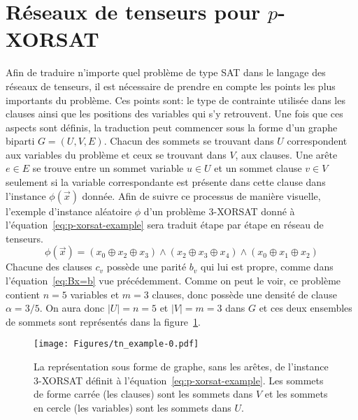 \section{Réseaux de tenseurs pour \texorpdfstring{$p$}{p}-XORSAT}\label{sec:tn-for-p-xorsat}
Afin de traduire n'importe quel problème de type SAT dans le langage des réseaux de tenseurs, il est nécessaire de prendre en compte les points les plus importants du problème.
Ces points sont: le type de contrainte utilisée dans les clauses ainsi que les positions des variables qui s'y retrouvent.
Une fois que ces aspects sont définis, la traduction peut commencer sous la forme d'un graphe biparti $G = (U, V, E)$.
Chacun des sommets se trouvant dans $U$ correspondent aux variables du problème et ceux se trouvant dans $V$, aux clauses.
Une arête $e \in E$ se trouve entre un sommet variable $u \in U$ et un sommet clause $v \in V$ seulement si la variable correspondante est présente dans cette clause dans l'instance $\phi(\vec{x})$ donnée.
Afin de suivre ce processus de manière visuelle, l'exemple d'instance aléatoire $\phi$ d'un problème $3$-XORSAT donné à l'équation~\ref{eq:p-xorsat-example} sera traduit étape par étape en réseau de tenseurs.
\begin{equation}\label{eq:p-xorsat-example}
    \phi(\vec{x}) = (x_0 \oplus x_2 \oplus x_3) \wedge (x_2 \oplus x_3 \oplus x_4) \wedge (x_0 \oplus x_1 \oplus x_2)
\end{equation}
Chacune des clauses $c_v$ possède une parité $b_v$ qui lui est propre, comme dans l'équation~\ref{eq:Bx=b} vue précédemment.
Comme on peut le voir, ce problème contient $n = 5$ variables et $m = 3$ clauses, donc possède une densité de clause $\alpha = 3/5$.
On aura donc $|U| = n = 5$ et $|V| = m = 3$ dans $G$ et ces deux ensembles de sommets sont représentés dans la figure~\ref{fig:tn-example0}.
\begin{figure}[h]
    \centering
    \texttt{[image: Figures/tn\_example-0.pdf]}
    \caption[La représentation sous forme de graphe, sans les arêtes, de l'instance $3$-XORSAT définit à l'équation~\ref{eq:p-xorsat-example}.]{La représentation sous forme de graphe, sans les arêtes, de l'instance $3$-XORSAT définit à l'équation~\ref{eq:p-xorsat-example}. Les sommets de forme carrée (les clauses) sont les sommets dans $V$ et les sommets en cercle (les variables) sont les sommets dans $U$.}
    \label{fig:tn-example0}
\end{figure}
